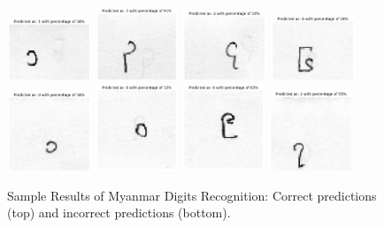 \vspace{0.5em}
\begin{figure}[h]%
\centering 
\includegraphics[width=0.225\textwidth]{imgs/1.png}
\includegraphics[width=0.22\textwidth]{imgs/3.png}
\includegraphics[width=0.225\textwidth]{imgs/4.png}
\includegraphics[width=0.225\textwidth]{imgs/6.png}
\includegraphics[width=0.225\textwidth]{imgs/1_0.png}
\includegraphics[width=0.22\textwidth]{imgs/0_8.png}
\includegraphics[width=0.22\textwidth]{imgs/9_6.png}
\includegraphics[width=0.225\textwidth]{imgs/7_2.png}
\caption{Sample Results of Myanmar Digits Recognition: Correct predictions (top) and incorrect predictions (bottom).}
\label{fig:p2resutls}
\end{figure}

